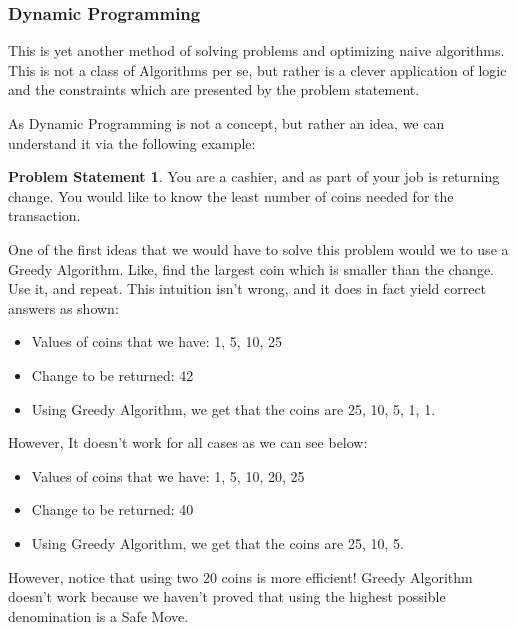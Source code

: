 \documentclass{article}
\theoremstyle{definition}
\theoremstyle{example}
\newtheorem*{example}{Problem Statement}
\begin{document}
\subsubsection{\Large Dynamic Programming}
\hspace{4mm} This is yet another method of solving problems and optimizing naive algorithms. This is not a class of Algorithms per se, but rather is a clever application of logic and the constraints which are presented by the problem statement. \par
\vspace{4mm}
As Dynamic Programming is not a concept, but rather an idea, we can understand it via the following example:\par
\vspace{4mm}
\theoremstyle{example}
\begin{example}
    You are a cashier, and as part of your job is returning change. You would like to know the least number of coins needed for the transaction.
\end{example}
One of the first ideas that we would have to solve this problem would we to use a Greedy Algorithm. Like, find the largest coin which is smaller than the change. Use it, and repeat. This intuition isn't wrong, and it does in fact yield correct answers as shown:\newpage

\begin{itemize}
    \item Values of coins that we have: 1, 5, 10, 25
    \item Change to be returned: 42
    \item Using Greedy Algorithm, we get that the coins are 25, 10, 5, 1, 1.
\end{itemize}
However, It doesn't work for all cases as we can see below:

\begin{itemize}
    \item Values of coins that we have: 1, 5, 10, 20, 25
    \item Change to be returned: 40
    \item Using Greedy Algorithm, we get that the coins are 25, 10, 5.
\end{itemize}
However, notice that using two 20 coins is more efficient! Greedy Algorithm doesn't work because we haven't proved that using the highest possible denomination is a Safe Move.\par
\vspace{3mm} \noindent
\end{document}
